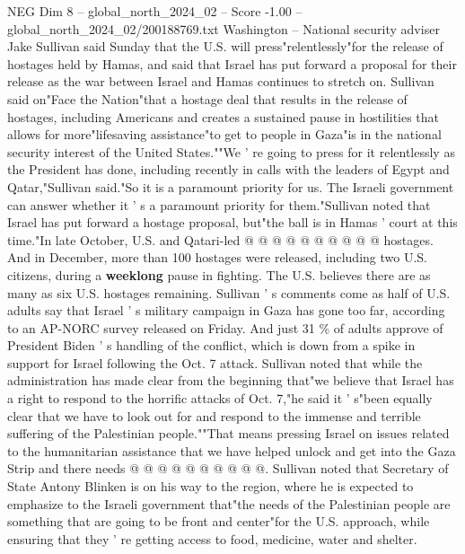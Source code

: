 \begin{textsample}{NEG Dim 8 – global\_north\_2024\_02 – Score -1.00 – global\_north\_2024\_02/200188769.txt}  \label{ex:f8_neg_231}
Washington -- National security adviser Jake Sullivan said Sunday that the U.S. will press"relentlessly"for the release of hostages held by Hamas, and said that Israel has put forward a proposal for their release as the war between Israel and Hamas continues to stretch on.
Sullivan said on"Face the Nation"that a hostage deal that results in the release of hostages, including Americans and creates a sustained pause in hostilities that allows for more"lifesaving assistance"to get to people in Gaza"is in the national security interest of the United States.""We ' re going to press for it relentlessly as the President has done, including recently in calls with the leaders of Egypt and Qatar,"Sullivan said."So it is a paramount priority for us.
The Israeli government can answer whether it ' s a paramount priority for them."Sullivan noted that Israel has put forward a hostage proposal, but"the ball is in Hamas ' court at this time."In late October, U.S. and Qatari-led @ @ @ @ @ @ @ @ @ @ hostages.
And in December, more than 100 hostages were released, including two U.S. citizens, during a \textbf{weeklong} pause in fighting.
The U.S. believes there are as many as six U.S. hostages remaining.
Sullivan ' s comments come as half of U.S. adults say that Israel ' s military campaign in Gaza has gone too far, according to an AP-NORC survey released on Friday.
And just 31 \% of adults approve of President Biden ' s handling of the conflict, which is down from a spike in support for Israel following the Oct. 7 attack.
Sullivan noted that while the administration has made clear from the beginning that"we believe that Israel has a right to respond to the horrific attacks of Oct. 7,"he said it ' s"been equally clear that we have to look out for and respond to the immense and terrible suffering of the Palestinian people.""That means pressing Israel on issues related to the humanitarian assistance that we have helped unlock and get into the Gaza Strip and there needs @ @ @ @ @ @ @ @ @ @.
Sullivan noted that Secretary of State Antony Blinken is on his way to the region, where he is expected to emphasize to the Israeli government that"the needs of the Palestinian people are something that are going to be front and center"for the U.S. approach, while ensuring that they ' re getting access to food, medicine, water and shelter.

\end{textsample}
